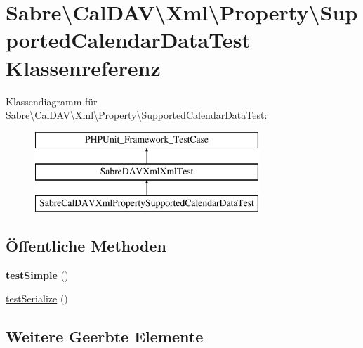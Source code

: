 \hypertarget{class_sabre_1_1_cal_d_a_v_1_1_xml_1_1_property_1_1_supported_calendar_data_test}{}\section{Sabre\textbackslash{}Cal\+D\+AV\textbackslash{}Xml\textbackslash{}Property\textbackslash{}Supported\+Calendar\+Data\+Test Klassenreferenz}
\label{class_sabre_1_1_cal_d_a_v_1_1_xml_1_1_property_1_1_supported_calendar_data_test}
Klassendiagramm für Sabre\textbackslash{}Cal\+D\+AV\textbackslash{}Xml\textbackslash{}Property\textbackslash{}Supported\+Calendar\+Data\+Test\+:\begin{figure}[H]
\begin{center}
\leavevmode
\includegraphics[height=3.000000cm]{class_sabre_1_1_cal_d_a_v_1_1_xml_1_1_property_1_1_supported_calendar_data_test}
\end{center}
\end{figure}
\subsection*{Öffentliche Methoden}
\begin{DoxyCompactItemize}
\item 
\mbox{\label{class_sabre_1_1_cal_d_a_v_1_1_xml_1_1_property_1_1_supported_calendar_data_test_aa3faf576f005386a08bdc2f57d1340d9}} 
{\bfseries test\+Simple} ()
\item 
\mbox{\hyperlink{class_sabre_1_1_cal_d_a_v_1_1_xml_1_1_property_1_1_supported_calendar_data_test_ab64c4e6e45792a1e0630339367d9470f}{test\+Serialize}} ()
\end{DoxyCompactItemize}
\subsection*{Weitere Geerbte Elemente}


